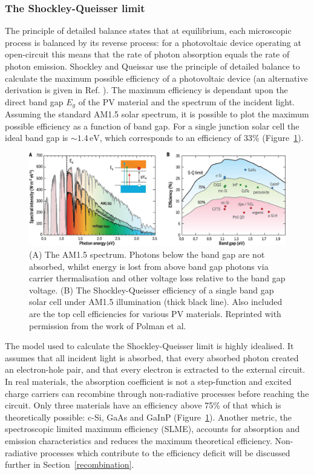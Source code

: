 \subsubsection{The Shockley-Queisser limit}\label{sec:SQlimit}
The principle of detailed balance states that at equilibrium, each microscopic process is balanced by its reverse process: for a photovoltaic device operating at open-circuit this means that the rate of photon absorption equals the rate of photon emission. Shockley and Queissar use the principle of detailed balance to calculate the maximum possible efficiency of a photovoltaic device\autocite{Shockley1961} (an alternative derivation is given in Ref. \autocite{Nelson2003}). The maximum efficiency is dependant upon the direct band gap $E_g$ of the PV material and the spectrum of the incident light. Assuming the standard AM1.5 solar spectrum, it is possible to plot the maximum possible efficiency as a function of band gap. For a single junction solar cell the ideal band gap is $\sim 1.4\,\text{eV}$, which corresponds to an efficiency of 33\% (Figure\ \ref{SQlimit}). 

\begin{figure}[h]
\centering
   \includegraphics[width=1.0\columnwidth]{figures/ch1/SQlimit.jpg}
   \caption[AM1.5 spectral intensity and Shockley-Queisser efficiency]{(A) The AM1.5 spectrum. Photons below the band gap are not absorbed, whilst energy is lost from above band gap photons via carrier thermalisation and other voltage loss relative to the band gap voltage. (B) The Shockley-Queisser efficiency of a single band gap solar cell under AM1.5 illumination (thick black line). Also included are the top cell efficiencies for various PV materials. Reprinted with permission from the work of Polman et al.\autocite{Polman2016}}
   \label{SQlimit}
\end{figure}

The model used to calculate the Shockley-Queisser limit is highly idealised. It assumes that all incident light is absorbed, that every absorbed photon created an electron-hole pair, and that every electron is extracted to the external circuit. In real materials, the absorption coefficient is not a step-function and excited charge carriers can recombine through non-radiative processes before reaching the circuit. Only three materials have an efficiency above 75\% of that which is theoretically possible: c-Si, GaAs and GaInP (Figure\ \ref{SQlimit}). Another metric, the spectroscopic limited maximum efficiency (SLME), accounts for absorption and emission characteristics and reduces the maximum theoretical efficiency.\autocite{Yu2012} Non-radiative processes which contribute to the efficiency deficit will be discussed further in Section\ \ref{recombination}.

